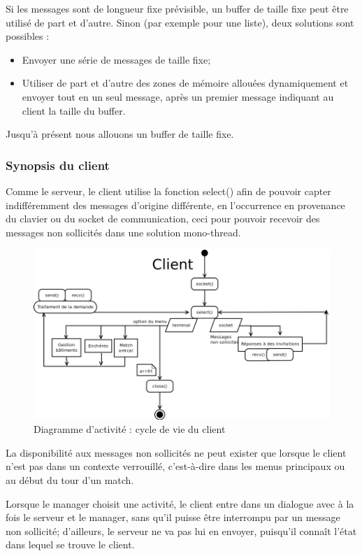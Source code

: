 \documentclass[a4paper,titlepage]{scrreprt}
\begin{document}
Si les messages sont de longueur fixe prévisible, un buffer de taille fixe peut être utilisé de part et d'autre.
Sinon (par exemple pour une liste), deux solutions sont possibles :
\begin{itemize}
  \item Envoyer une série de messages de taille fixe;
  \item Utiliser de part et d'autre des zones de mémoire allouées dynamiquement et envoyer tout en un seul message, après un premier message indiquant au client la taille du buffer.
\end{itemize}
Jusqu'à présent nous allouons un buffer de taille fixe.

  \subsubsection{Synopsis du client}
Comme le serveur, le client utilise la fonction select() afin de pouvoir capter indifféremment des messages d'origine différente,
 en l’occurrence en provenance du clavier ou du socket de communication, ceci pour pouvoir recevoir des messages non sollicités dans une solution mono-thread.
      \begin{figure}[H]
    \center
    \includegraphics[scale=0.4]{uml/Client.png}
    \caption{Diagramme d'activité : cycle de vie du client} \label{diag-client}
    \end{figure}
 La disponibilité aux messages non sollicités ne peut exister que lorsque le client
 n'est pas dans un contexte verrouillé, c'est-à-dire dans les menus principaux ou au début du tour d'un match.
 
 Lorsque le manager choisit une activité, le client entre dans un dialogue avec à la fois le serveur et le manager,
 sans qu'il puisse être interrompu par un message non sollicité; d'ailleurs, le serveur ne va pas lui en envoyer,
 puisqu'il connaît l'état dans lequel se trouve le client.
 
\end{document}
